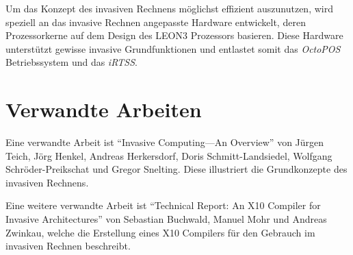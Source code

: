 Um das Konzept des invasiven Rechnens möglichst effizient auszunutzen, wird speziell an das invasive Rechnen
angepasste Hardware entwickelt, deren Prozessorkerne auf dem Design des LEON3 Prozessors basieren.
Diese Hardware unterstützt gewisse invasive Grundfunktionen und entlastet somit das \textit{OctoPOS} Betriebssystem
und das \textit{iRTSS}.\cite{invasiveArrays}

\section{Verwandte Arbeiten}

Eine verwandte Arbeit ist "`Invasive Computing—An Overview"'\cite{invasiveOverview}
von Jürgen Teich, Jörg Henkel, Andreas Herkersdorf, Doris Schmitt-Landsiedel, Wolfgang Schröder-Preikschat
und Gregor Snelting. Diese illustriert die Grundkonzepte des invasiven Rechnens.

Eine weitere verwandte Arbeit ist "`Technical Report: An X10 Compiler for Invasive Architectures"'\cite{invasiveX10} 
von Sebastian Buchwald, Manuel Mohr und Andreas Zwinkau, welche die Erstellung eines X10 Compilers für den Gebrauch 
im invasiven Rechnen beschreibt.
